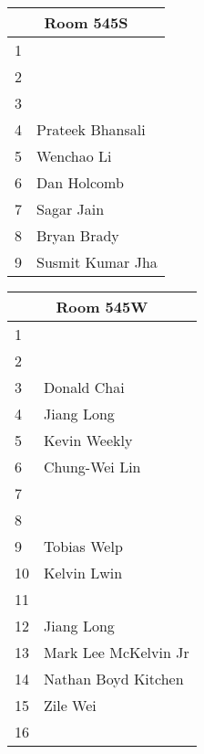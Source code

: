\documentclass{article}
\begin{document}
\noindent
\begin{tabular}{|l|l|}
\hline
\multicolumn{2}{|c|}{Room 545S} \\ \hline\hline
1& \\
2& \\
3& \\
4&Prateek Bhansali\\
5&Wenchao Li\\
6&Dan Holcomb\\
7&Sagar Jain\\
8&Bryan Brady\\
9&Susmit Kumar Jha\\

\hline
\end{tabular}
\vspace{1in}

\noindent
\begin{tabular}{|l|l|}
\hline
\multicolumn{2}{|c|}{Room 545W} \\ \hline\hline
1& \\
2& \\
3&Donald Chai\\
4&Jiang Long\\
5&Kevin Weekly\\
6&Chung-Wei Lin\\
7& \\
8& \\
9&Tobias Welp\\
10&Kelvin Lwin\\
11& \\
12&Jiang Long\\
13&Mark Lee McKelvin Jr\\
14&Nathan Boyd Kitchen\\
15&Zile Wei\\
16& \\

\hline
\end{tabular}
\end{document}
